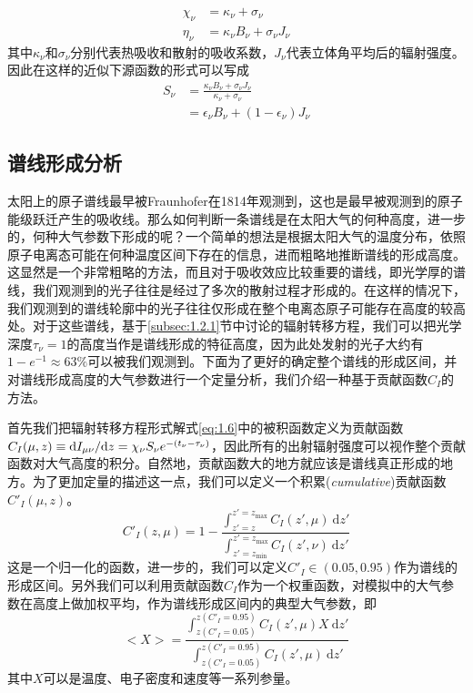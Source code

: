 \begin{align}
	\chi_\nu &= \kappa_\nu + \sigma_\nu \\
	\eta_\nu &= \kappa_\nu B_\nu + \sigma_\nu J_\nu
\end{align}
其中$\kappa_\nu$和$\sigma_\nu$分别代表热吸收和散射的吸收系数，$J_\nu$代表立体角平均后的辐射强度。因此在这样的近似下源函数的形式可以写成\parencites{Mihalas2014}
\begin{align}
	S_\nu &= \frac{\kappa_\nu B_\nu + \sigma_\nu J_\nu}{\kappa_\nu + \sigma_\nu} \nonumber \\
	& = \epsilon_\nu B_\nu + (1-\epsilon_\nu )J_\nu
\end{align}
\subsection{谱线形成分析}\label{sec:1.2.2}
太阳上的原子谱线最早被Fraunhofer在1814年观测到，这也是最早被观测到的原子能级跃迁产生的吸收线。那么如何判断一条谱线是在太阳大气的何种高度，进一步的，何种大气参数下形成的呢？一个简单的想法是根据太阳大气的温度分布，依照原子电离态可能在何种温度区间下存在的信息，进而粗略地推断谱线的形成高度。这显然是一个非常粗略的方法，而且对于吸收效应比较重要的谱线，即光学厚的谱线，我们观测到的光子往往是经过了多次的散射过程才形成的。在这样的情况下，我们观测到的谱线轮廓中的光子往往仅形成在整个电离态原子可能存在高度的较高处。对于这些谱线，基于\ref{subsec:1.2.1}节中讨论的辐射转移方程，我们可以把光学深度$\tau_\nu = 1$的高度当作是谱线形成的特征高度，因为此处发射的光子大约有$1 - e^{-1}\approx63\%$可以被我们观测到。下面为了更好的确定整个谱线的形成区间，并对谱线形成高度的大气参数进行一个定量分析，我们介绍一种基于贡献函数$C_{I}$\parencite{Magain1986,Carlsson1997,Kowalski2015}的方法。

首先我们把辐射转移方程形式解式\eqref{eq:1.6}中的被积函数定义为贡献函数$C_I(\mu,z) \equiv \mathrm{d} I_{\mu \nu}/\mathrm{d} z = \chi_\nu S_\nu e^{-(t_\nu-\tau_\nu)}$，因此所有的出射辐射强度可以视作整个贡献函数对大气高度的积分。自然地，贡献函数大的地方就应该是谱线真正形成的地方。为了更加定量的描述这一点，我们可以定义一个积累(\textit{cumulative})贡献函数$C'_I(\mu,z)$\parencite{Kowalski2016b}。
\begin{equation}
    C'_I(z,\mu) = 1- \frac{\int^{z'=z_{\mathrm{max}}}_{z' = z} C_I(z',\mu)\ \mathrm{d}z'}{\int^{z'=z_{\mathrm{max}}}_{z' = z_{\mathrm{min}}} C_I(z',\nu)\ \mathrm{d}z'}
\end{equation}
这是一个归一化的函数，进一步的，我们可以定义$C'_I \in (0.05,0.95)$作为谱线的形成区间。另外我们可以利用贡献函数$C_I$作为一个权重函数，对模拟中的大气参数在高度上做加权平均，作为谱线形成区间内的典型大气参数，即
\begin{equation}
    <X> = \frac{\int^{z\left(C'_I=0.95\right)}_{z\left(C'_I=0.05\right)}C_I(z',\mu)X\ \mathrm{d}z'}{\int^{z\left(C'_I=0.95\right)}_{z\left(C'_I=0.05\right)}C_I(z',\mu)\ \mathrm{d}z'}
\end{equation}
其中$X$可以是温度、电子密度和速度等一系列参量。
